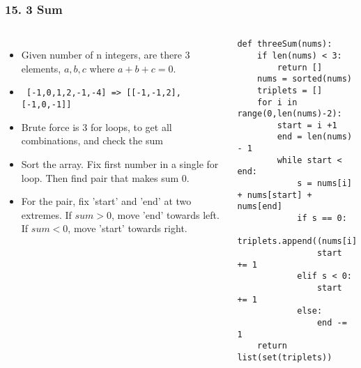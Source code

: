 \begin{frame}[fragile]\frametitle{15. 3 Sum}

	\begin{columns}[T]
	\begin{itemize}
	\item Given number of n integers, are there 3 elements, $a,b,c$ where $a+b+c = 0$.
	\item \lstinline{ [-1,0,1,2,-1,-4] => [[-1,-1,2],[-1,0,-1]]}
	\item Brute force is 3 for loops, to get all combinations, and check the sum
	\item Sort the array. Fix first number in a single for loop. Then find pair that makes sum 0.
	\item For the pair, fix 'start' and 'end' at two extremes. If $sum > 0$, move 'end' towards left. If $sum < 0$, move 'start' towards right.
	\end{itemize}
		\begin{lstlisting}[basicstyle=\scriptsize]
def threeSum(nums):
    if len(nums) < 3:
        return []
    nums = sorted(nums)
    triplets = []
    for i in range(0,len(nums)-2):
        start = i +1
        end = len(nums) - 1
        while start < end:
            s = nums[i] + nums[start] + nums[end]
            if s == 0:
                triplets.append((nums[i],nums[start],nums[end]))
                start += 1
            elif s < 0:
                start += 1
            else:
                end -= 1
    return list(set(triplets))		
				\end{lstlisting}		

	\end{columns}
		
\end{frame}

